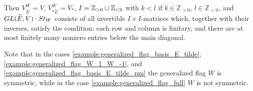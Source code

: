 \documentclass[11pt, a4paper]{article}
\begin{document}
\label{example:generalized_flag_basis_E_tilde_pm} Then $V^W_{\widetilde{E}}=V$, $V^W_{*\widetilde{E}}=V_*$, %
$I=\mathbb{Z}_{>0} \sqcup \mathbb{Z}_{<0}$ with $k<l$ if $k\in \mathbb{Z}_{>0}$, $l\in \mathbb{Z}_{<0}$, and $GL(\widetilde{E},V) \cdot St_W$ consists of all invertible $I\times I$-matrices which, together with their inverses, satisfy the condition: each row and column %
is finitary, and there are at most finitely many nonzero entries below the main diagonal.
\vspace{0.4cm}


Note that in the cases \ref{example:generalized_flag_basis_E_tilde}, \ref{example:generalized_flag_W_1_W_-1}, and \ref{example:generalized_flag_basis_E_tilde_pm} the generalized flag $W$ is symmetric, while in the case \ref{example:generalized_flag_full} $W$ is not symmetric.


\label{section:more_background}
\end{document}
